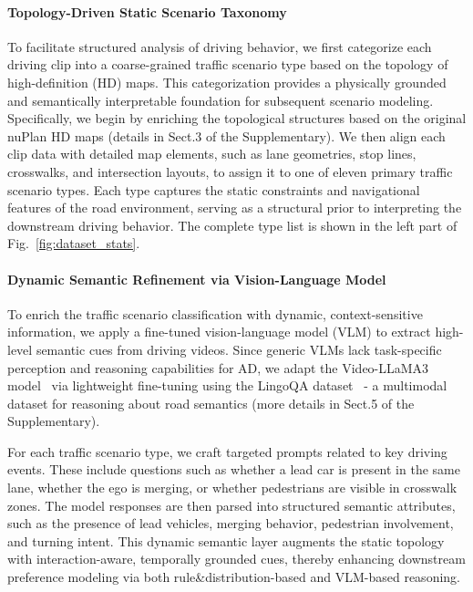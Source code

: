 \documentclass{article}
\begin{document}
\paragraph{Topology-Driven Static Scenario Taxonomy}
To facilitate structured analysis of driving behavior, we first categorize each driving clip into a coarse-grained traffic scenario type based on the topology of high-definition (HD) maps. This categorization provides a physically grounded and semantically interpretable foundation for subsequent scenario modeling. Specifically, we begin by enriching the topological structures based on the original nuPlan HD maps (details in Sect.3 of the Supplementary). We then align each clip data with detailed map elements, such as lane geometries, stop lines, crosswalks, and intersection layouts, to assign it to one of eleven primary traffic scenario types. Each type captures the static constraints and navigational features of the road environment, serving as a structural prior to interpreting the downstream driving behavior. The complete type list is shown in the left part of Fig.~\ref{fig:dataset_stats}.

\paragraph{Dynamic Semantic Refinement via Vision-Language Model}
To enrich the traffic scenario classification with dynamic, context-sensitive information, we apply a fine-tuned vision-language model (VLM) to extract high-level semantic cues from driving videos. Since generic VLMs lack task-specific perception and reasoning capabilities for AD, we adapt the Video-LLaMA3 model~\cite{zhang2025videollama} via lightweight fine-tuning using the LingoQA dataset~\cite{marcu2024lingoqa} - a multimodal dataset for reasoning about road semantics (more details in Sect.5 of the Supplementary).

For each traffic scenario type, we craft targeted prompts related to key driving events. These include questions such as whether a lead car is present in the same lane, whether the ego is merging, or whether pedestrians are visible in crosswalk zones. The model responses are then parsed into structured semantic attributes, such as the presence of lead vehicles, merging behavior, pedestrian involvement, and turning intent. This dynamic semantic layer augments the static topology with interaction-aware, temporally grounded cues, thereby enhancing downstream preference modeling via both rule\&distribution-based and VLM-based reasoning.
\end{document}
